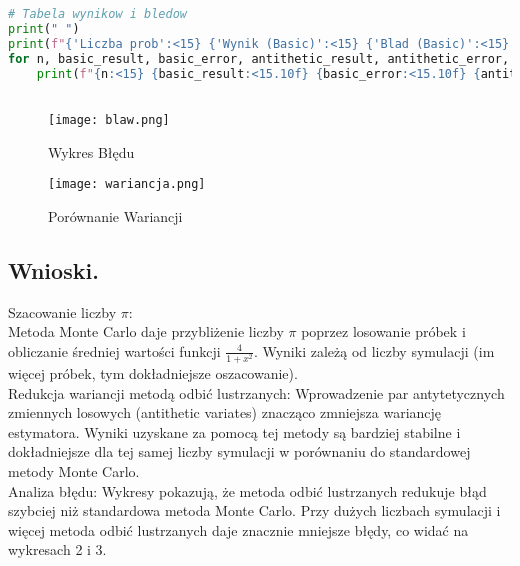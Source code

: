 \documentclass[12pt,letterpaper]{article}
\theoremstyle{definition}
\begin{document}
\begin{lstlisting}[language=Python, caption=Skrypt do Zad 3.]
# Tabela wynikow i bledow
print(" ")
print(f"{'Liczba prob':<15} {'Wynik (Basic)':<15} {'Blad (Basic)':<15} {'Wynik (Antithetic)':<20} {'Blad (Antithetic)':<20} {'Wynik (Control Variate)':<25} {'Blad (Control Variate)':<25}")
for n, basic_result, basic_error, antithetic_result, antithetic_error, control_variate_result, control_variate_error in zip(n_values, basic_results, basic_errors, antithetic_results, antithetic_errors, control_variate_results, control_variate_errors):
    print(f"{n:<15} {basic_result:<15.10f} {basic_error:<15.10f} {antithetic_result:<20.10f} {antithetic_error:<20.10f} {control_variate_result:<25.10f} {control_variate_error:<25.10f}")



\end{lstlisting}

\begin{figure}[H]
			\centering

				\centering
				\texttt{[image: blaw.png]}
				\caption{Wykres Błędu}
				\label{fig:zdjecie1}
			\hfill
		\end{figure}
  
\begin{figure}[H]
			\centering

				\centering
				\texttt{[image: wariancja.png]}
				\caption{Porównanie Wariancji}
				\label{fig:zdjecie1}
			\hfill
		\end{figure}
  

\subsection{Wnioski.}
Szacowanie liczby $\pi$:\\
Metoda Monte Carlo daje przybliżenie liczby $\pi$ poprzez losowanie próbek i obliczanie średniej wartości funkcji $\frac{4}{1+x^2}.$ Wyniki zależą od liczby symulacji (im więcej próbek, tym dokładniejsze oszacowanie).\\

Redukcja wariancji metodą odbić lustrzanych: 
Wprowadzenie par antytetycznych zmiennych losowych (antithetic variates) znacząco zmniejsza wariancję estymatora. Wyniki uzyskane za pomocą tej metody są bardziej stabilne i dokładniejsze dla tej samej liczby symulacji w porównaniu do standardowej metody Monte Carlo.\\

Analiza błędu: 
Wykresy pokazują, że metoda odbić lustrzanych redukuje błąd szybciej niż standardowa metoda Monte Carlo. Przy dużych liczbach symulacji i więcej metoda odbić lustrzanych daje znacznie mniejsze błędy, co widać na wykresach 2 i 3.\\
\end{document}
